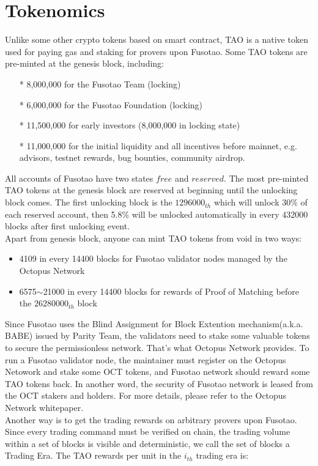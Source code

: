 \documentclass[a4paper,12pt]{article}
\begin{document}
\section{Tokenomics}
Unlike some other crypto tokens based on smart contract, TAO is a native token used for paying gas and staking for provers upon Fusotao. Some TAO tokens are pre-minted at the genesis block, including:
\begin{itemize}
    \item[*] 8,000,000 for the Fusotao Team (locking)
    \item[*] 6,000,000 for the Fusotao Foundation (locking)
    \item[*] 11,500,000 for early investors (8,000,000 in locking state)
    \item[*] 11,000,000 for the initial liquidity and all incentives before mainnet, e.g. advisors, testnet rewards, bug bounties, community airdrop.
\end{itemize}
All accounts of Fusotao have two states $free$ and $reserved$. The most pre-minted TAO tokens at the genesis block are reserved at beginning until the unlocking block comes. The first unlocking block is the $1296000_{th}$ which will unlock 30\% of each reserved account, then 5.8\% will be unlocked automatically in every 432000 blocks after first unlocking event. \\
Apart from genesis block, anyone can mint TAO tokens from void in two ways:
\begin{itemize}
    \item 4109 in every 14400 blocks for Fusotao validator nodes managed by the Octopus Network
    \item 6575$\sim$21000 in every 14400 blocks for rewards of Proof of Matching before the $26280000_{th}$ block
\end{itemize}
Since Fusotao uses the Blind Assignment for Block Extention mechanism(a.k.a. BABE) issued by Parity Team, the validators need to stake some valuable tokens to secure the permissionless network. That's what Octopus Network provides. To run a Fusotao validator node, the maintainer must register on the Octopus Netowork and stake some OCT tokens, and Fusotao network should reward some TAO tokens back. In another word, the security of Fusotao network is leased from the OCT stakers and holders. For more details, please refer to the Octopus Network whitepaper.\\
Another way is to get the trading rewards on arbitrary provers upon Fusotao. Since every trading command must be verified on chain, the trading volume within a set of blocks is visible and deterministic, we call the set of blocks a Trading Era. The TAO rewards per unit in the $i_{th}$ trading era is:
\end{document}
